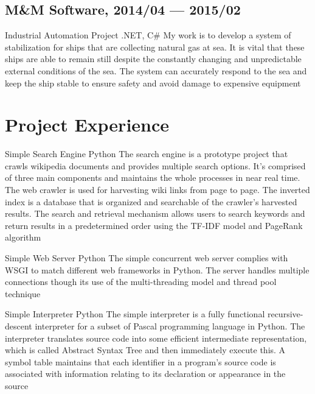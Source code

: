 \documentclass[11pt,a4paper]{moderncv}
\begin{document}
\subsection{M\&M Software, 2014/04 --- 2015/02}
\cventry{}
{Industrial Automation Project}
{.NET, C\#}
{}{}
{
My work is to develop a system of stabilization for ships that are collecting natural gas at sea. It is vital that these ships are able to remain still despite the constantly changing and unpredictable external conditions of the sea. The system can accurately respond to the sea and keep the ship stable to ensure safety and avoid damage to expensive equipment
}


\section{Project Experience}
\cventry{}
{Simple Search Engine}
{Python}
{}{}
{
The search engine is a prototype project that crawls wikipedia documents and provides multiple search options. It's comprised of three main components and maintains the whole processes in near real time. The web crawler is used for harvesting wiki links from page to page. The inverted index is a database that is organized and searchable of the crawler's harvested results. The search and retrieval mechanism allows users to search keywords and return results in a predetermined order using the TF-IDF model and PageRank algorithm
}

\vspace*{0.2\baselineskip}
\cventry{}
{Simple Web Server}
{Python}
{}{}
{
The simple concurrent web server complies with WSGI to match different web frameworks in Python. The server handles multiple connections though its use of the multi-threading model and thread pool technique
}

\vspace*{0.2\baselineskip}
\cventry{}
{Simple Interpreter}
{Python}
{}{}
{
The simple interpreter is a fully functional recursive-descent interpreter for a subset of Pascal programming language in Python. The interpreter translates source code into some efficient intermediate representation, which is called Abstract Syntax Tree and then immediately execute this. A symbol table maintains that each identifier in a program's source code is associated with information relating to its declaration or appearance in the source
}
\end{document}
